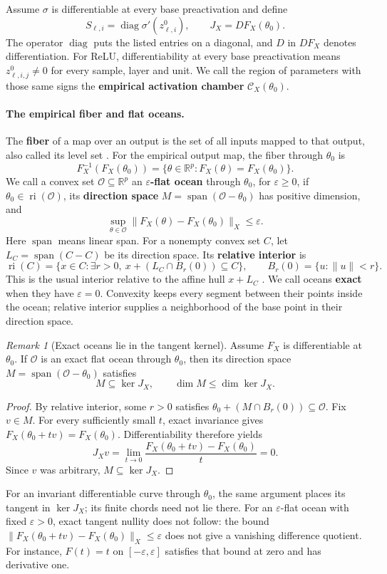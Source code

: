 \documentclass[twoside]{article}
\theoremstyle{remark}
\newtheorem{remark}[theorem]{Remark}
\DeclareMathOperator{\spanop}{span}
\DeclareMathOperator{\diag}{diag}
\DeclareMathOperator{\ri}{ri}
\newcommand{\R}{\mathbb R}
\newcommand{\cC}{\mathcal C}
\theoremstyle{highlightdefinition}
\theoremstyle{remark}
\newcommand{\spn}{\spanop}
\begin{document}
Assume $\sigma$ is differentiable at every base preactivation and define
\[
 S_{\ell,i}=\diag\sigma'(z_{\ell,i}^0),\qquad J_X=DF_X(\theta_0).
\]
The operator $\diag$ puts the listed entries on a diagonal, and $D$ in $DF_X$ denotes differentiation. For ReLU, differentiability at every base preactivation means $z_{\ell,i,j}^0\ne0$ for every sample, layer and unit. We call the region of parameters with those same signs the \textbf{empirical activation chamber} $\cC_X(\theta_0)$.

\paragraph{The empirical fiber and flat oceans.}
The \textbf{fiber} of a map over an output is the set of all inputs mapped to that output, also called its level set \citep[Ch.~4]{lee2013smooth}. For the empirical output map, the fiber through $\theta_0$ is
\[
 F_X^{-1}(F_X(\theta_0))=\{\theta\in\R^p:F_X(\theta)=F_X(\theta_0)\}.
\]
We call a convex set $\mathcal O\subseteq\R^p$ an \textbf{$\varepsilon$-flat ocean} through $\theta_0$, for $\varepsilon\ge0$, if $\theta_0\in\ri(\mathcal O)$, its \textbf{direction space} $M=\spn(\mathcal O-\theta_0)$ has positive dimension, and
\[
 \sup_{\theta\in\mathcal O}\|F_X(\theta)-F_X(\theta_0)\|_X\le\varepsilon.
\]
Here $\spn$ means linear span. For a nonempty convex set $C$, let $L_C=\spn(C-C)$ be its direction space. Its \textbf{relative interior} is
\[
 \ri(C)=\{x\in C:\exists r>0,\ x+(L_C\cap B_r(0))\subseteq C\},
 \qquad B_r(0)=\{u:\|u\|<r\}.
\]
This is the usual interior relative to the affine hull $x+L_C$ \citep{boyd2004convex}. We call oceans \textbf{exact} when they have $\varepsilon=0$. Convexity keeps every segment between their points inside the ocean; relative interior supplies a neighborhood of the base point in their direction space.

\begin{remark}[Exact oceans lie in the tangent kernel]\label{rem:exact-ocean-tangent}
Assume $F_X$ is differentiable at $\theta_0$. If $\mathcal O$ is an exact flat ocean through $\theta_0$, then its direction space $M=\spn(\mathcal O-\theta_0)$ satisfies
\[
 M\subseteq\ker J_X,\qquad \dim M\le\dim\ker J_X.
\]
\end{remark}
\begin{proof}
By relative interior, some $r>0$ satisfies $\theta_0+(M\cap B_r(0))\subseteq\mathcal O$. Fix $v\in M$. For every sufficiently small $t$, exact invariance gives $F_X(\theta_0+tv)=F_X(\theta_0)$. Differentiability therefore yields
\[
 J_Xv=\lim_{t\to0}\frac{F_X(\theta_0+tv)-F_X(\theta_0)}{t}=0.
\]
Since $v$ was arbitrary, $M\subseteq\ker J_X$.
\end{proof}
For an invariant differentiable curve through $\theta_0$, the same argument places its tangent in $\ker J_X$; its finite chords need not lie there. For an $\varepsilon$-flat ocean with fixed $\varepsilon>0$, exact tangent nullity does not follow: the bound $\|F_X(\theta_0+tv)-F_X(\theta_0)\|_X\le\varepsilon$ does not give a vanishing difference quotient. For instance, $F(t)=t$ on $[-\varepsilon,\varepsilon]$ satisfies that bound at zero and has derivative one.
\end{document}
